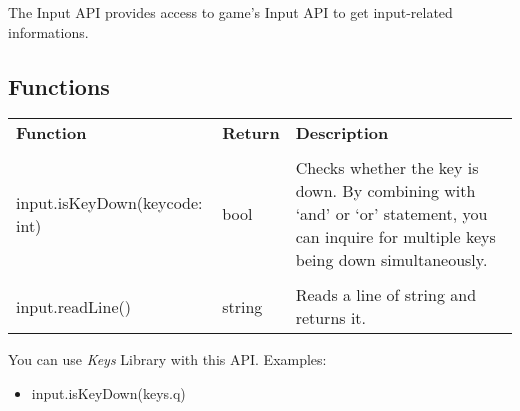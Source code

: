 The Input API provides access to game's Input API to get input-related informations.

\subsection{Functions}

\begin{tabularx}{\textwidth}{l l X}
	\textbf{\large Function} & \textbf{\large Return} & \textbf{\large Description}
	\\ \\
	\endhead
	input.isKeyDown(keycode: int) & bool & Checks whether the key is down. By combining with `and' or `or' statement, you can inquire for multiple keys being down simultaneously.
	\\ \\
	input.readLine() & string & Reads a line of string and returns it.
\end{tabularx}

You can use \emph{Keys} Library with this API. Examples:

\begin{itemize}
\item input.isKeyDown(keys.q)
\end{itemize}